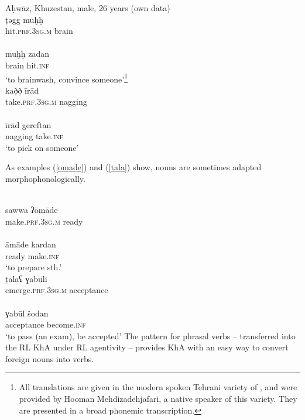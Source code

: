 \documentclass[output=paper,nonflat]{langsci/langscibook}
\begin{document}
\ea \label{muxx}
\ea Aḥwāz, Khuzestan, male, 26 years (own data)\\
\gll ṭəgg muḫḫ\\
     hit.\textsc{prf}.3\textsc{sg}.\textsc{m} brain\\ 
\\
\gll muḫḫ zadan\\
     brain hit.\textsc{inf} \\
\glt ‘to brainwash, convince someone’\footnote{All  translations are given in the modern spoken Tehrani variety of , and were provided by Hooman Mehdizadehjafari, a native speaker of this variety. They are presented in a broad phonemic transcription.} 
\z
\ex \label{irad}
\\
\gll kað̣ð̣ īrād\\
     take.\textsc{prf}.3\textsc{sg}.\textsc{m} nagging\\ 
\\
\gll īrād gereftan\\
     nagging take.\textsc{inf}\\
\glt ‘to pick on someone’ 
\z\z

 As examples (\ref{omade}) and (\ref{tala}) show,  nouns are sometimes adapted morphophonologically.

\ea \label{omade}
\\
\gll sawwa ʔōmāde\\
     make.\textsc{prf}.3\textsc{sg}.\textsc{m} ready\\ 
\\
\gll āmāde kardan \\
     ready make.\textsc{inf}\\
\glt ‘to prepare sth.’
\z\ex \label{tala}
\\
\gll ṭalaʕ ɣabūli\footnotemark \\
     emerge.\textsc{prf}.3\textsc{sg}.\textsc{m} acceptance\\
\\
\gll ɣabūl šodan\\
     acceptance become.\textsc{inf} \\
\glt ‘to pass (an exam), be accepted’
\z\z
{}
The pattern for phrasal verbs – transferred into the {RL} KhA under {RL} agentivity – provides KhA with an easy way to convert foreign nouns into verbs.
\end{document}
